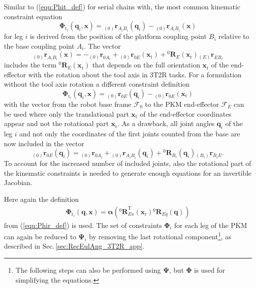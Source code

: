 \documentclass[twocolumn,10pt]{IFTOMM}
\newcommand{\bm}[1]{\boldsymbol{#1}}
\newcommand{\ortvek}[4]{{ }_{(#1)}{\boldsymbol{#2}}^{#3}_{#4} }
\newcommand{\rotmat}[2]{{{ }^{#1}\boldsymbol{R}}_{#2}}
\newcommand{\transp}[0]{{\mathrm{T}}}
\newcommand{\ks}[1]{{\mathcal{F}}_{#1}}
\begin{document}
Similar to (\ref{equ:Phit_def}) for serial chains with, the most common kinematic constraint equation 
%
\begin{equation}
\bm{\Phi}_{\mathrm{t}_i}(\bm{q}_i,\bm{x}) = \ortvek{0}{r}{}{A_iB_i}(\bm{q}_i) - \ortvek{0}{r}{}{A_iB_i}(\bm{x})
\end{equation}
%
for leg $i$ is derived from the position of the platform coupling point $B_i$ relative to the base coupling point $A_i$. The vector
\begin{equation}
\ortvek{0}{r}{}{A_iB_i}(\bm{x}) = 
- \ortvek{0}{r}{}{0A_i}
+ \ortvek{0}{r}{}{0E}(\bm{x}_{\mathrm{t}}) + \rotmat{0}{E}(\bm{x}_{\mathrm{r}}) \ortvek{E}{r}{}{EB_i}
\end{equation}
%
includes the term $\rotmat{0}{E}(\bm{x}_{\mathrm{r}})$ that depends on the full orientation $\bm{x}_{\mathrm{r}}$ of the end-effector with the rotation about the tool axis in 3T2R tasks.
For a formulation without the tool axis rotation a different constraint definition
%
\begin{equation}
\bm{\Phi}_{\mathrm{t}_i}(\bm{q}_i,\bm{x}) = 
\ortvek{0}{r}{}{0E}(\bm{q}_i) - \ortvek{0}{r}{}{0E}(\bm{x}_{\mathrm{t}})
\end{equation}
%
with the vector from the robot base frame $\ks{0}$ to the PKM end-effector $\ks{E}$ can be used where 
only the translational part $\bm{x}_{\mathrm{t}}$ of the end-effector coordinates appear and not the rotational part $\bm{x}_{\mathrm{r}}$.
As a drawback, all joint angles $\bm{q}_i$ of the leg $i$ and not only the coordinates of the first joints counted from the base are now included
in the vector
%
\begin{equation}
\ortvek{0}{r}{}{0E}(\bm{q}_i) = 
\ortvek{0}{r}{}{0A_i}
+ \ortvek{0}{r}{}{A_iB_i}(\bm{q}_i) + \rotmat{0}{B_i}(\bm{q}_i) \ortvek{B_i}{r}{}{B_iE}.
\end{equation}
%
To account for the increased number of included joints, also the rotational part of the kinematic constraints is needed to generate enough equations for an invertible Jacobian.

Here again the definition 
%
\begin{align}
\bm{\Phi}_{\mathrm{r}_i}(\bm{q},\bm{x})
=\bm{\alpha}\left(\rotmat{0}{Ex}^\transp (\bm{x}_{\mathrm{r}})\rotmat{0}{Eq}(\bm{q})\right)
\end{align}
%
from (\ref{equ:Phir_def}) is used.
The set of constraints $\bm{\Phi}_{i}$ for each leg of the PKM can again be reduced to $\bm{\Psi}_{i}$ by removing the last rotational component\footnote{The following steps can also be performed using $\bm{\Psi}$, but $\bm{\Phi}$ is used for simplifying the equations.}, as described in Sec.\,\ref{sec:RecEulAng_3T2R_app}.
\end{document}
